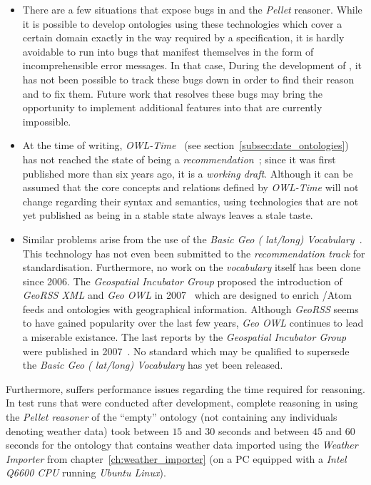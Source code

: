 \begin{itemize}
  \item There are a few situations that expose bugs in \protege and the \emph{Pellet} reasoner. While it is possible to develop ontologies using these technologies which cover a certain domain exactly in the way required by a specification, it is hardly avoidable to run into bugs that manifest themselves in the form of incomprehensible error messages. In that case, During the development of \thinkhomeweather, it has not been possible to track these bugs down in order to find their reason and to fix them. Future work that resolves these bugs may bring the opportunity to implement additional features into \thinkhomeweather that are currently impossible.
  
  \item At the time of writing, \emph{OWL-Time}~\cite{owl-time} (see section~\ref{subsec:date_ontologies}) has not reached the state of being a \emph{ recommendation}~\cite{w3c-process}; since it was first published more than six years ago, it is a \emph{working draft}. Although it can be assumed that the core concepts and relations defined by \emph{OWL-Time} will not change regarding their syntax and semantics, using technologies that are not yet published as being in a stable state always leaves a stale taste.
  
  \item Similar problems arise from the use of the \emph{Basic Geo ( lat/long) Vocabulary}~\cite{wgs84_vocabulary}. This technology has not even been submitted to the \emph{ recommendation track} for standardisation. Furthermore, no work on the \emph{ vocabulary} itself has been done since 2006. The \emph{ Geospatial Incubator Group} proposed the introduction of \emph{GeoRSS XML} and \emph{Geo OWL} in 2007~\cite{w3c_geo_report1} which are designed to enrich /Atom feeds and  ontologies with geographical information. Although \emph{GeoRSS} seems to have gained popularity over the last few years, \emph{Geo OWL} continues to lead a miserable existance. The last reports by the \emph{ Geospatial Incubator Group} were published in 2007~\cite{w3c_geo_report1,w3c_geo_report2}. No standard which may be qualified to supersede the \emph{Basic Geo ( lat/long) Vocabulary} has yet been released.
\end{itemize}

Furthermore, \thinkhomeweather suffers performance issues regarding the time required for reasoning. In test runs that were conducted after development, complete reasoning in \protege using the \emph{Pellet reasoner} of the ``empty'' ontology (not containing any individuals denoting weather data) took between $15$ and $30$ seconds and between $45$ and $60$ seconds for the ontology that contains weather data imported using the \emph{Weather Importer} from chapter~\ref{ch:weather_importer} (on a PC equipped with a \emph{Intel Q6600 CPU} running \emph{Ubuntu Linux}). %


